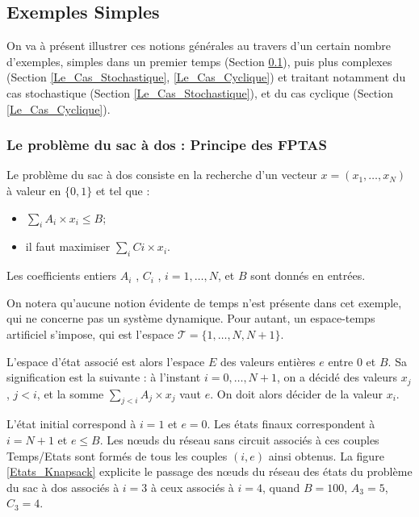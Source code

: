 \subsection{Exemples Simples}
\label{Exemples_Simples}
On va à présent illustrer ces notions générales au travers d'un certain nombre d'exemples, simples dans un premier temps (Section \ref{Exemples_Simples}), puis plus complexes (Section \ref{Le_Cas_Stochastique},  \ref{Le_Cas_Cyclique}) et traitant notamment du cas stochastique (Section \ref{Le_Cas_Stochastique}), %
 et du cas cyclique (Section \ref{Le_Cas_Cyclique}).
\subsubsection{Le problème du sac à dos : Principe des FPTAS}
Le problème du sac à dos consiste en la recherche d'un vecteur $x = (x_1, \dots, x_N)$ à valeur en $\{0, 1\}$ et tel que :
\begin{itemize}[label=$\square$]
	\item	$\sum_i A_i \times x_i \leq B $;
	\item	il faut maximiser $\sum_i Ci\times x_i$.
\end{itemize}

Les coefficients entiers  $A_i$ , $C_i$ , $i = 1, \dots, N$, et $B$ sont donnés en entrées.

On notera qu'aucune notion évidente de temps n'est présente dans cet exemple, qui ne concerne pas un système dynamique. Pour autant, un espace-temps artificiel s'impose, qui est l'espace $\mathcal{T} = \{1, \dots, N, N+1\}$. 

L'espace d'état associé est alors l'espace $E$ des valeurs entières $ e$ entre $0$ et $B$. Sa signification est la suivante : à l'instant $i = 0, \dots, N+1$,  on a décidé des valeurs $x_j$, $j < i$, et la somme $\sum_{ j < i} A_j \times x_j$ vaut $e$. On doit alors décider de la valeur $x_i$.

L'état initial correspond à $i = 1$ et $e = 0$. Les états finaux correspondent à $i = N+1$ et $e \leq B$.
Les nœuds du réseau sans circuit associés à ces couples Temps/Etats sont formés de tous les couples $(i, e)$ ainsi obtenus. La figure \ref{Etats_Knapsack} explicite le passage des nœuds du réseau des états du problème du sac à dos associés à $i = 3$ à ceux associés à $i = 4$, quand $B = 100$, $A_3 = 5$, $C_3 = 4$.

